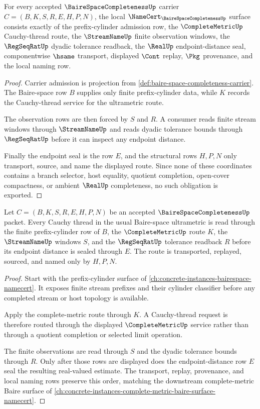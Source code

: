 \begin{theorem}
\label{thm:baire-space-completeness-namecert-obligations}
For every accepted $\BaireSpaceCompletenessUp$ carrier $C=(B,K,S,R,E,H,P,N)$, the local $\NameCert_{\BaireSpaceCompletenessUp}$ surface consists exactly of the prefix-cylinder admission row, the $\CompleteMetricUp$ Cauchy-thread route, the $\StreamNameUp$ finite observation windows, the $\RegSeqRatUp$ dyadic tolerance readback, the $\RealUp$ endpoint-distance seal, componentwise $\hsame$ transport, displayed $\Cont$ replay, $\Pkg$ provenance, and the local naming row.
\end{theorem}
\begin{proof}
Carrier admission is projection from \autoref{def:baire-space-completeness-carrier}. The Baire-space row $B$ supplies only finite prefix-cylinder data, while $K$ records the Cauchy-thread service for the ultrametric route.

The observation rows are then forced by $S$ and $R$. A consumer reads finite stream windows through $\StreamNameUp$ and reads dyadic tolerance bounds through $\RegSeqRatUp$ before it can inspect any endpoint distance.

Finally the endpoint seal is the row $E$, and the structural rows $H,P,N$ only transport, source, and name the displayed route. Since none of these coordinates contains a branch selector, host equality, quotient completion, open-cover compactness, or ambient $\RealUp$ completeness, no such obligation is exported.
\end{proof}

\begin{theorem}
\label{thm:baire-space-completeness-cauchy-thread-route}
Let $C=(B,K,S,R,E,H,P,N)$ be an accepted $\BaireSpaceCompletenessUp$ packet. Every Cauchy thread in the usual Baire-space ultrametric is read through the finite prefix-cylinder row of $B$, the $\CompleteMetricUp$ route $K$, the $\StreamNameUp$ windows $S$, and the $\RegSeqRatUp$ tolerance readback $R$ before its endpoint distance is sealed through $E$. The route is transported, replayed, sourced, and named only by $H,P,N$.
\end{theorem}
\begin{proof}
Start with the prefix-cylinder surface of \autoref{ch:concrete-instances-bairespace-namecert}. It exposes finite stream prefixes and their cylinder classifier before any completed stream or host topology is available.

Apply the complete-metric route through $K$. A Cauchy-thread request is therefore routed through the displayed $\CompleteMetricUp$ service rather than through a quotient completion or selected limit operation.

The finite observations are read through $S$ and the dyadic tolerance bounds through $R$. Only after those rows are displayed does the endpoint-distance row $E$ seal the resulting real-valued estimate. The transport, replay, provenance, and local naming rows preserve this order, matching the downstream complete-metric Baire surface of \autoref{ch:concrete-instances-complete-metric-baire-surface-namecert}.
\end{proof}

